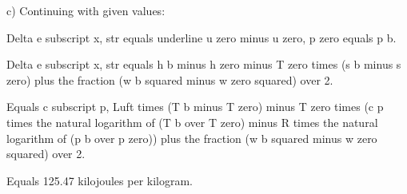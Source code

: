 c) Continuing with given values:

Delta e subscript x, str equals underline u zero minus u zero, p zero equals p b.

Delta e subscript x, str equals h b minus h zero minus T zero times (s b minus s zero) plus the fraction (w b squared minus w zero squared) over 2.

Equals c subscript p, Luft times (T b minus T zero) minus T zero times (c p times the natural logarithm of (T b over T zero) minus R times the natural logarithm of (p b over p zero)) plus the fraction (w b squared minus w zero squared) over 2.

Equals 125.47 kilojoules per kilogram.